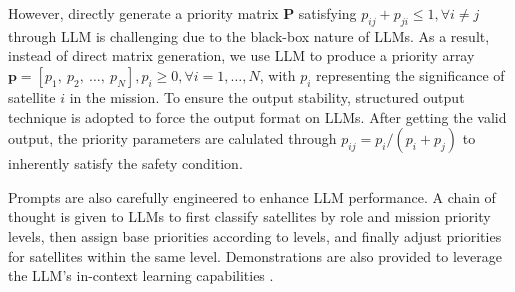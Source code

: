 \documentclass{ifacconf}
\begin{document}
\par However, directly generate a priority matrix $\boldsymbol{P}$ satisfying $p_{ij} + p_{ji} \le 1, \forall i \neq j$ through LLM is challenging due to the black-box nature of LLMs.
As a result, instead of direct matrix generation, we use LLM to produce a priority array $\mathbf{p} = [p_1,~p_2,~\dots,~p_N], p_i \ge 0, \forall i = 1, \dots, N$, with $p_i$ representing the significance of satellite $i$ in the mission.
To ensure the output stability, structured output technique is adopted to force the output format on LLMs.
After getting the valid output, the priority parameters are calulated through $p_{ij} = p_i/(p_i + p_j)$ to inherently satisfy the safety condition.

\par Prompts are also carefully engineered to enhance LLM performance. A chain of thought is given to LLMs to first  classify satellites by role and mission priority levels, then assign base priorities according to levels, and finally adjust priorities for satellites within the same level.
Demonstrations are also provided to leverage the LLM's in-context learning capabilities \cite[]{Min2022fewshot}.
\end{document}
